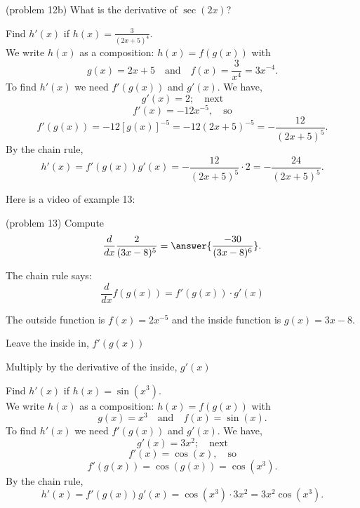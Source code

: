 \documentclass[handout]{ximera}
\begin{document}
\begin{problem}(problem 12b)
What is the derivative of $\sec(2x)$?
\begin{multipleChoice}
\end{multipleChoice}
\end{problem}



\begin{example}[example 13]
Find $h'(x)$ if $h(x) = \frac{3}{(2x + 5)^4}$.\\
We write $h(x)$ as a composition: $h(x)=f(g(x))$ with 
\[
g(x) = 2x+ 5  \quad \text{and} \quad  f(x) = \frac{3}{x^4} = 3x^{-4}.
\]
 To find $h'(x)$ we need $f'(g(x))$ and $g'(x)$.  We have,
\[g'(x) = 2; \quad \text{next}\]
\[f'(x) = -12x^{-5}, \quad \text{so}\]
\[f'(g(x)) = -12[g(x)]^{-5} = -12(2x+5)^{-5} = -\frac{12}{(2x+5)^5}.\]
By the chain rule,
\[h'(x) = f'(g(x))g'(x) = -\frac{12}{(2x+5)^5}\cdot 2 = -\frac{24}{(2x+5)^5}.\]
\end{example}

Here is a video of example 13:
\begin{foldable}
\end{foldable}




\begin{problem}(problem 13)
  Compute
  \[
  \frac{d}{dx} \frac{2}{(3x - 8)^5} = \answer{\frac{-30}{(3x - 8)^6}}.
  \]
  
    \begin{hint}
      The chain rule says:
      \[
      \frac{d}{dx} f(g(x)) = f'(g(x))\cdot g'(x)
      \]
    \end{hint}
    \begin{hint}
      The outside function is $f(x) = 2x^{-5}$ and the inside
      function is $g(x) = 3x - 8$.
    \end{hint}
    
    \begin{hint}
		  Leave the inside in, $f'(g(x))$
		\end{hint}
		\begin{hint}
		  Multiply by the derivative of the inside, $g'(x)$
		\end{hint}
    
\end{problem}


\begin{example}[example 14]
Find $h'(x)$ if $h(x) = \sin(x^3)$.\\
We write $h(x)$ as a composition: $h(x)=f(g(x))$ with 
\[g(x) = x^3  \quad \text{and} \quad  f(x) = \sin(x).\] 
To find $h'(x)$ we need $f'(g(x))$ and $g'(x)$.  We have, 
\[g'(x) = 3x^2; \quad \text{next} \]
\[f'(x) =\cos(x) , \quad \text{so}\]
\[ f'(g(x)) = \cos(g(x)) = \cos(x^3).\]
By the chain rule,
\[h'(x) = f'(g(x))g'(x) = \cos(x^3)\cdot 3x^2 = 3x^2\cos(x^3).\]
\end{example}
\end{document}
